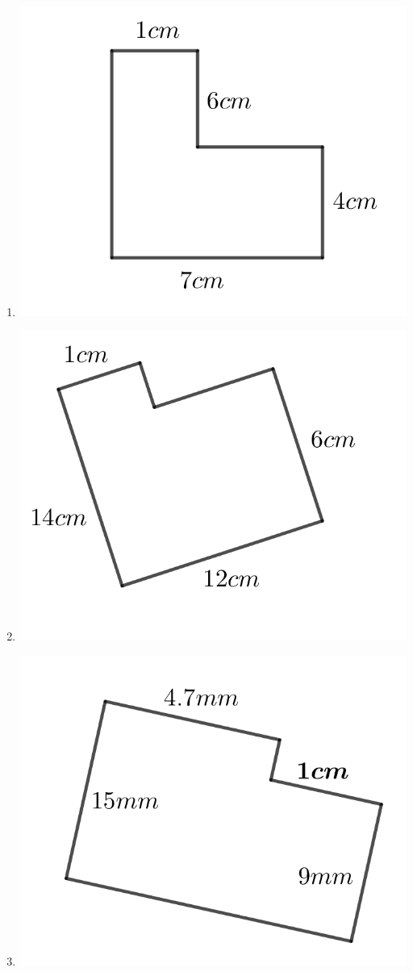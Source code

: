 \begin{multicols}{2}
\begin{enumerate}
	\item \includegraphics{./Images/Measurement/perimeter9.png}
	\item \includegraphics{./Images/Measurement/perimeter10.png}
	\item \includegraphics{./Images/Measurement/perimeter11.png}

\end{enumerate}
\end{multicols}
